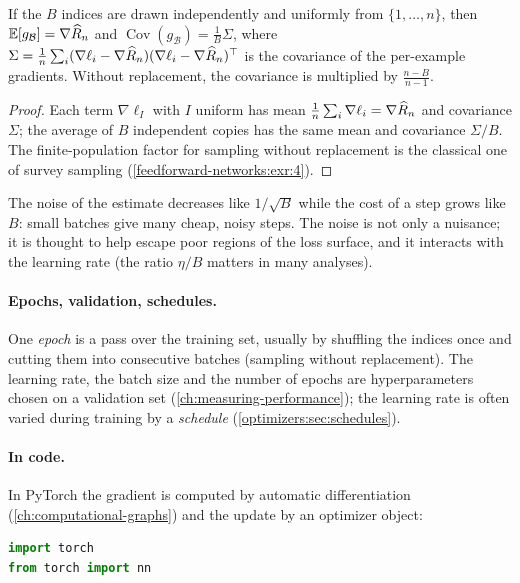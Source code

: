 \begin{notechapter}
\begin{proposition}\label{feedforward-networks:prop:minibatch}
If the $B$ indices are drawn independently and uniformly from $\{1,\dots,n\}$, then
$\mathbb{E}[g_{\mathcal B}] = \nabla\widehat{R}_n$ and $\operatorname{Cov}(g_{\mathcal B}) = \frac1B\Sigma$, where
$\Sigma = \frac1n\sum_i(\nabla\ell_i - \nabla\widehat{R}_n)(\nabla\ell_i - \nabla\widehat{R}_n)^\top$ is the covariance of the per-example gradients.
Without replacement, the covariance is multiplied by $\frac{n - B}{n - 1}$.
\end{proposition}

\begin{proof}
Each term $\nabla\ell_{I}$ with $I$ uniform has mean $\frac1n\sum_i\nabla\ell_i = \nabla\widehat{R}_n$ and covariance $\Sigma$; the average of $B$
independent copies has the same mean and covariance $\Sigma/B$. The finite-population factor for
sampling without replacement is the classical one of survey sampling
(\cref{feedforward-networks:exr:4}).
\end{proof}

The noise of the estimate decreases like $1/\sqrt B$ while the cost of a step grows like $B$:
small batches give many cheap, noisy steps. The noise is not only a nuisance; it is thought
to help escape poor regions of the loss surface, and it interacts with the learning rate
(the ratio $\eta/B$ matters in many analyses).

\paragraph{Epochs, validation, schedules.} One \emph{epoch} is a pass over the training set,
usually by shuffling the indices once and cutting them into consecutive batches (sampling
without replacement). The learning rate, the batch size and the number of epochs are
hyperparameters chosen on a validation set (\cref{ch:measuring-performance}); the learning
rate is often varied during training by a \emph{schedule} (\cref{optimizers:sec:schedules}).

\paragraph{In code.} In PyTorch the gradient is computed by automatic differentiation
(\cref{ch:computational-graphs}) and the update by an optimizer object:
\begin{lstlisting}[language=Python]
import torch
from torch import nn


\end{lstlisting}
\end{notechapter}

